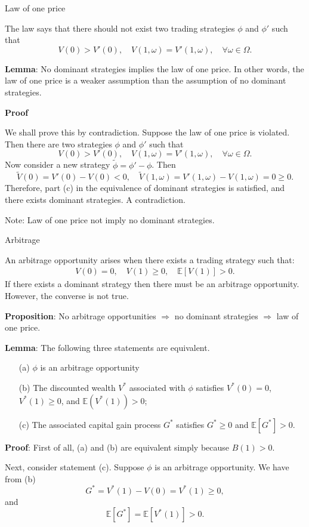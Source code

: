 \documentclass{beamer}
\begin{document}
\begin{frame}{Law of one price}

    {\footnotesize \footnotesize
    The law says that there should not exist two trading strategies $\phi$ and $\phi'$ such that  
    \[
    V(0) > V'(0), \quad V(1, \omega) = V'(1, \omega), \quad \forall \omega \in \Omega.
    \]
    \par \textbf{Lemma}: No dominant strategies implies the law of one price. In other words, 
    the law of one price is a weaker assumption than the assumption of no dominant strategies.
    \par \textbf{Proof}
    \par We shall prove this by contradiction. Suppose the law of one price is violated. Then there are two strategies $\phi$ and $\phi'$ such that  
\[
V(0) > V'(0), \quad V(1, \omega) = V'(1, \omega), \quad \forall \omega \in \Omega.
\]  
Now consider a new strategy $\tilde{\phi} = \phi' - \phi$. Then  
\[
\tilde{V}(0) = V'(0) - V(0) < 0, \quad \tilde{V}(1, \omega) = V'(1, \omega) - V(1, \omega) = 0 \geq 0.
\]  
Therefore, part (c) in the equivalence of dominant strategies is satisfied, and there exists dominant strategies. A contradiction.
\par Note: Law of one price not imply no dominant strategies.
    }
\end{frame}

\begin{frame}{Arbitrage}

    {\footnotesize \footnotesize
     An arbitrage opportunity arises when there exists a trading strategy such that:
     \begin{align*}
        V(0)=0,\quad V(1)\geq 0,\quad \mathbb{E}[V(1)]>0.
     \end{align*}
    If there exists a dominant strategy then there must be an arbitrage opportunity. 
     However, the converse is not true.
     \par \textbf{Proposition}: No arbitrage opportunities $\Rightarrow$ no 
     dominant strategies $\Rightarrow$ law of one price.
     \par \textbf{Lemma}: The following three statements are equivalent.
     \begin{enumerate}
        \item[(a)] $\phi$ is an arbitrage opportunity
        \item[(b)] The discounted wealth $V^*$ associated with $\phi$ satisfies $V^*(0) = 0$, $V^*(1) \geq 0$, and $\mathbb{E}(V^*(1)) > 0$;
        \item[(c)] The associated capital gain process $G^*$ satisfies $G^* \geq 0$ and $\mathbb{E}[G^*] > 0$.
        \end{enumerate}
    \par \textbf{Proof}:
    First of all, (a) and (b) are equivalent simply because $B(1) > 0$.

Next, consider statement (c). Suppose $\phi$ is an arbitrage opportunity. We have from (b)
\[
G^* = V^*(1) - V(0) = V^*(1) \geq 0,
\]
and
\[
\mathbb{E}[G^*] = \mathbb{E}[V^*(1)] > 0.
\]
    }
\end{frame}
\end{document}
